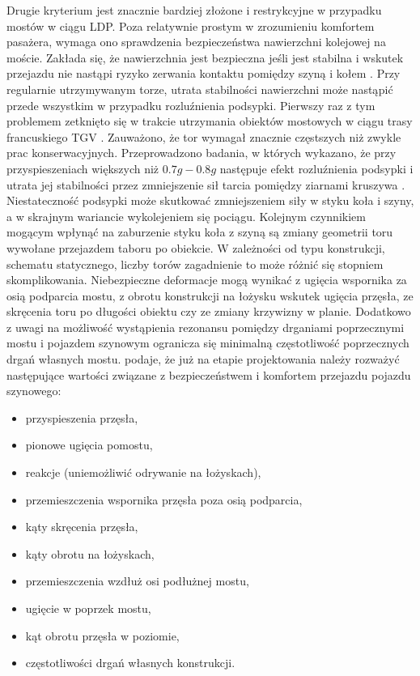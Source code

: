 Drugie kryterium jest znacznie bardziej złożone i restrykcyjne w przypadku mostów w ciągu LDP. Poza relatywnie prostym w zrozumieniu komfortem pasażera, wymaga ono sprawdzenia bezpieczeństwa nawierzchni kolejowej na moście. Zakłada się, że nawierzchnia jest bezpieczna jeśli jest stabilna i wskutek przejazdu nie nastąpi ryzyko zerwania kontaktu pomiędzy szyną i kołem \parencite{Ramondenc2008}. Przy regularnie utrzymywanym torze, utrata stabilności nawierzchni może nastąpić przede wszystkim w przypadku rozluźnienia podsypki. Pierwszy raz z tym problemem zetknięto się w trakcie utrzymania obiektów mostowych w ciągu trasy francuskiego TGV \parencite{Ramondenc1998}. Zauważono, że tor wymagał znacznie częstszych niż zwykle prac konserwacyjnych. Przeprowadzono badania, w których wykazano, że przy przyspieszeniach większych niż $0.7g-0.8g$ następuje efekt rozluźnienia podsypki i utrata jej stabilności przez zmniejszenie sił tarcia pomiędzy ziarnami kruszywa \parencite{Zacher2008}. Niestateczność podsypki może skutkować zmniejszeniem siły w styku koła i szyny, a w skrajnym wariancie wykolejeniem się pociągu. Kolejnym czynnikiem mogącym wpłynąć na zaburzenie styku koła z szyną są zmiany geometrii toru wywołane przejazdem taboru po obiekcie. W zależności od typu konstrukcji, schematu statycznego, liczby torów zagadnienie to może różnić się stopniem skomplikowania. Niebezpieczne deformacje mogą wynikać z ugięcia wspornika za osią podparcia mostu, z obrotu konstrukcji na łożysku wskutek ugięcia przęsła, ze skręcenia toru po długości obiektu czy ze zmiany krzywizny w planie. Dodatkowo z uwagi na możliwość wystąpienia rezonansu pomiędzy drganiami poprzecznymi mostu i pojazdem szynowym ogranicza się minimalną częstotliwość poprzecznych drgań własnych mostu. 
\parencite{Niemierko} podaje, że już na etapie projektowania należy rozważyć następujące wartości związane z bezpieczeństwem i komfortem przejazdu pojazdu szynowego:
\begin{itemize}[noitemsep]
	\item przyspieszenia przęsła,
	\item pionowe ugięcia pomostu,
	\item reakcje (uniemożliwić odrywanie na łożyskach),
	\item przemieszczenia wspornika przęsła poza osią podparcia,
	\item kąty skręcenia przęsła,
	\item kąty obrotu na łożyskach,
	\item przemieszczenia wzdłuż osi podłużnej mostu,
	\item ugięcie w poprzek mostu,
	\item kąt obrotu przęsła w poziomie,
	\item częstotliwości drgań własnych konstrukcji.
\end{itemize}

